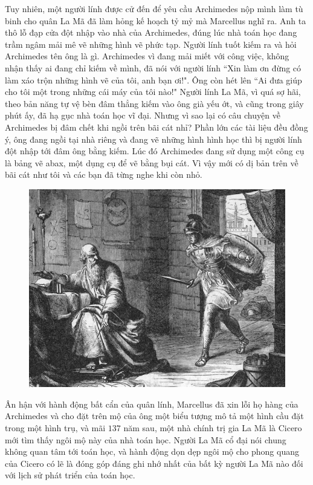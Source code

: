 \begin{multicols}{2}
	\vskip 0.1cm
	Tuy nhiên, một người lính được cử đến để yêu cầu Archimedes nộp mình làm tù binh cho quân La Mã đã làm hỏng kế hoạch tỷ mỷ mà Marcellus nghĩ ra. Anh ta thô lỗ đạp cửa đột nhập vào nhà của Archimedes, đúng lúc  nhà toán học đang trầm ngâm mải mê vẽ những hình vẽ phức tạp. Người lính tuốt kiếm ra và hỏi Archimedes tên ông là gì. Archimedes vì đang mải miết với công việc, không nhận thấy ai đang chỉ kiếm về mình, đã nói với người lính ``Xin làm ơn đừng có làm xáo trộn những hình vẽ của tôi, anh bạn ơi!". Ông còn hét lên ``Ai đưa giúp cho tôi một trong những cái máy của tôi nào!" Người lính La Mã, vì quá sợ hãi, theo bản năng tự vệ bèn đâm thẳng kiếm vào ông già yếu ớt, và cũng trong giây phút ấy, đã hạ gục nhà toán học vĩ đại.
	\vskip 0.1cm
	Nhưng vì sao lại có câu chuyện về Archimedes bị đâm chết khi ngồi trên bãi cát nhỉ? Phần lớn các tài liệu đều đồng ý, ông đang ngồi tại nhà riêng và đang vẽ những hình hình học thì bị người lính đột nhập tới đâm ông bằng kiếm. Lúc đó Archimedes đang sử dụng một công cụ là bảng vẽ abax, một dụng cụ để vẽ bằng bụi cát. Vì vậy mới có dị bản trên về bãi cát như tôi và các bạn đã từng nghe khi còn nhỏ.
	\begin{figure}[H]
		\vspace*{-5pt}
		\centering
		\captionsetup{labelformat= empty, justification=centering}
		\includegraphics[width= 1\linewidth]{2}
		\vspace*{-15pt}
	\end{figure}
	Ân hận với hành động bất cẩn của quân lính, Marcellus đã xin lỗi họ hàng của Archimedes và cho đặt trên mộ của ông một biểu tượng mô tả một hình cầu đặt trong một hình trụ, và mãi $137$ năm sau, một nhà chính trị gia La Mã là Cicero mới tìm thấy ngôi mộ này của nhà toán học. Người La Mã cổ đại nói chung không quan tâm tới toán học, và hành động dọn dẹp ngôi mộ cho phong quang của Cicero có lẽ là đóng góp đáng ghi nhớ nhất của bất kỳ người La Mã nào đối với lịch sử phát triển của toán học.

\end{multicols}
